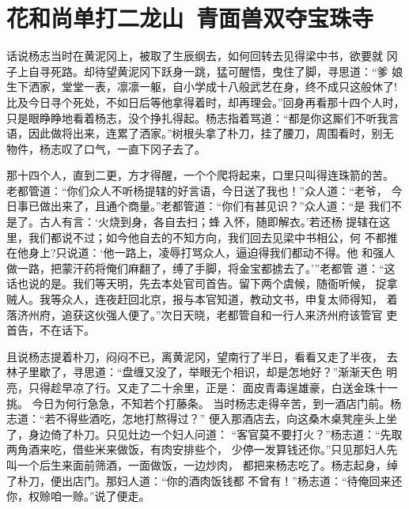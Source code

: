 \chapter{花和尚单打二龙山~青面兽双夺宝珠寺}

话说杨志当时在黄泥冈上，被取了生辰纲去，如何回转去见得梁中书，欲要就
冈子上自寻死路。却待望黄泥冈下跃身一跳，猛可醒悟，曳住了脚，寻思道：“爹
娘生下洒家，堂堂一表，凛凛一躯，自小学成十八般武艺在身，终不成只这般休了!
比及今日寻个死处，不如日后等他拿得着时，却再理会。”回身再看那十四个人时，
只是眼睁睁地看着杨志，没个挣扎得起。杨志指着骂道：“都是你这厮们不听我言
语，因此做将出来，连累了洒家。”树根头拿了朴刀，挂了腰刀，周围看时，别无
物件，杨志叹了口气，一直下冈子去了。

那十四个人，直到二更，方才得醒，一个个爬将起来，口里只叫得连珠箭的苦。
老都管道：“你们众人不听杨提辖的好言语，今日送了我也！”众人道：“老爷，
今日事已做出来了，且通个商量。”老都管道：“你们有甚见识？”众人道：“是
我们不是了。古人有言：‘火烧到身，各自去扫；蜂入怀，随即解衣。’若还杨
提辖在这里，我们都说不过；如今他自去的不知方向，我们回去见梁中书相公，何
不都推在他身上?只说道：‘他一路上，凌辱打骂众人，逼迫得我们都动不得。他
和强人做一路，把蒙汗药将俺们麻翻了，缚了手脚，将金宝都掳去了。’”老都管
道：“这话也说的是。我们等天明，先去本处官司首告。留下两个虞候，随衙听候，
捉拿贼人。我等众人，连夜赶回北京，报与本官知道，教动文书，申复太师得知，
着落济州府，追获这伙强人便了。”次日天晓，老都管自和一行人来济州府该管官
吏首告，不在话下。

且说杨志提着朴刀，闷闷不已，离黄泥冈，望南行了半日，看看又走了半夜，
去林子里歇了，寻思道：“盘缠又没了，举眼无个相识，却是怎地好？”渐渐天色
明亮，只得趁早凉了行。又走了二十余里，正是：
面皮青毒逞雄豪，白送金珠十一挑。
今日为何行急急，不知若个打藤条。
当时杨志走得辛苦，到一酒店门前。杨志道：“若不得些酒吃，怎地打熬得过？”
便入那酒店去，向这桑木桌凳座头上坐了，身边倚了朴刀。只见灶边一个妇人问道：
“客官莫不要打火？”杨志道：“先取两角酒来吃，借些米来做饭，有肉安排些个，
少停一发算钱还你。”只见那妇人先叫一个后生来面前筛酒，一面做饭，一边炒肉，
都把来杨志吃了。杨志起身，绰了朴刀，便出店门。那妇人道：“你的酒肉饭钱都
不曾有！”杨志道：“待俺回来还你，权赊咱一赊。”说了便走。

